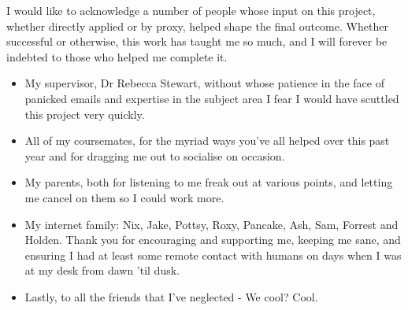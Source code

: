 I would like to acknowledge a number of people whose input on this project, whether directly applied or by proxy, helped shape the final outcome. Whether successful or otherwise, this work has taught me so much, and I will forever be indebted to those who helped me complete it.
\begin{itemize}
\item My supervisor, Dr Rebecca Stewart, without whose patience in the face of panicked emails and expertise in the subject area I fear I would have scuttled this project very quickly. 

\item All of my coursemates, for the myriad ways you've all helped over this past year and for dragging me out to socialise on occasion.

\item My parents, both for listening to me freak out at various points, and letting me cancel on them so I could work more. 

\item My internet family: Nix, Jake, Pottsy, Roxy, Pancake, Ash, Sam, Forrest and Holden. Thank you for encouraging and supporting me, keeping me sane, and ensuring I had at least some remote contact with humans on days when I was at my desk from dawn 'til dusk.
 
\item Lastly, to all the friends that I've neglected - We cool? Cool.
\end{itemize}
